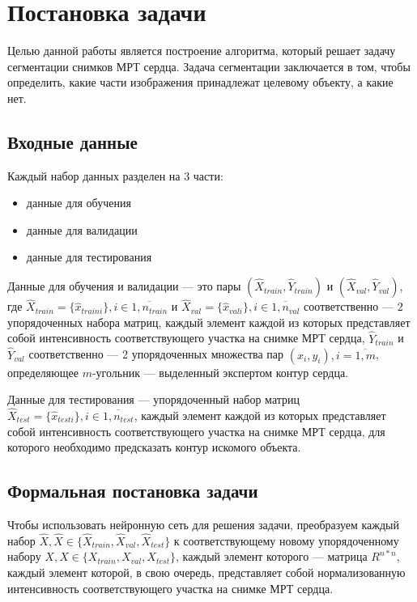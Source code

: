 \section{Постановка задачи}

Целью данной работы является построение алгоритма, который решает задачу сегментации снимков МРТ сердца. Задача сегментации заключается в том, чтобы определить, какие части изображения принадлежат целевому объекту, а какие нет. 

\subsection{Входные данные}

Каждый набор данных разделен на 3 части: 

\begin{itemize}
  \item данные для обучения
  \item данные для валидации
  \item данные для тестирования
\end{itemize}

Данные для обучения и валидации — это пары $(\hat{X}_{train},\hat{Y}_{train})$ и $(\hat{X}_{val},\hat{Y}_{val})$, где $\hat{X}_{train} = \{\hat{x}_{train i}\}, i\in{}\overline{1,n_{train}}$ и $\hat{X}_{val} = \{\hat{x}_{val i}\}, i\in{}\overline{1,n_{val}}$ соответственно — 2 упорядоченных набора матриц, каждый элемент каждой из которых представляет собой интенсивность соответствующего участка на снимке МРТ сердца, $\hat{Y}_{train}$ и $\hat{Y}_{val}$ соответственно — 2 упорядоченных множества пар $(x_{i},y_{i}), i = \overline{1,m}$, определяющее \mbox{$m$-угольник} — выделенный экспертом контур сердца.

Данные для тестирования — упорядоченный набор матриц $\hat{X}_{test} = \{\hat{x}_{test i}\}, i\in{}\overline{1,n_{test}}$, каждый элемент каждой из которых представляет собой интенсивность соответствующего участка на снимке МРТ сердца, для которого необходимо предсказать контур искомого объекта.

\subsection{Формальная постановка задачи}

Чтобы использовать нейронную сеть для решения задачи, преобразуем каждый набор $\hat{X},\hat{X}\in{}\{\hat{X}_{train},\hat{X}_{val},\hat{X}_{test}\}$ к соответствующему новому упорядоченному набору $X,X\in{}\{X_{train},X_{val},X_{test}\}$, каждый элемент которого — матрица $R^{n*n}$, каждый элемент которой, в свою очередь, представляет собой нормализованную интенсивность соответствующего участка на снимке МРТ сердца. 

